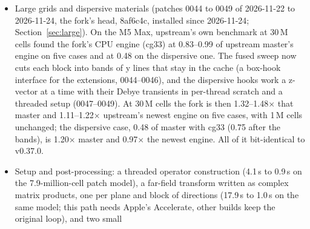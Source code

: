 \begin{itemize}
  stock in the same rounds (cg29 at 8 threads, its best setting; stock at its best of 2, 4 and 8 threads), it runs
  the four models 4.73--6.89$\times$ and the two large ones 1.95$\times$ and 2.72$\times$ as fast as stock
  (Table~\ref{tab:current}); paired with cg18 in rounds of its own (5 rounds, other processes on 0.3--0.6 cores; the
  SMA launch on its 0.871\,M-cell mesh), 1.03--1.23$\times$ as fast at 4 threads and 1.13--1.44$\times$ at 8 over the
  six models. An opt-in tiled sweep (patch 0040 of 2026-11-11, part of the build installed on 2026-11-14) runs
  several time steps on one cache-sized tile that all threads share; at 4 threads it is ahead of the fused sweep at
  its best on two large grids (1.08 and 1.23$\times$) and behind on four other models (0.71--0.92$\times$;
  Section~\ref{sec:tiled}). Three further patches (0041 to 0043, written on 2026-11-12 and 2026-11-13, then the fork's head, 13350ca,
  installed on 2026-11-14) start the automatic thread search at every core outside the efficiency class and pack the state of Debye,
  Lorentz and Drude cells for the line hooks: on the M5 Pro the search then runs at 0.97--1.00 of a fixed 15 threads where cg31's
  ran at 0.81--0.96, and upstream's dispersive case ran 1.9$\times$ as fast at 1\,M cells (Section~\ref{sec:cg33}).
\item Large grids and dispersive materials (patches 0044 to 0049 of 2026-11-22 to 2026-11-24, the fork's head, 8af6c4c, installed since 2026-11-24; Section~\ref{sec:large}). On the M5 Max, upstream's own benchmark at 30\,M cells found the fork's CPU engine (cg33) at 0.83--0.99 of upstream master's  engine on five cases and at 0.48 on the dispersive one. The fused sweep now cuts each block into bands of y lines that stay in the cache (a box-hook interface for the extensions, 0044--0046), and the dispersive hooks work a z-vector at a time with their Debye transients in per-thread scratch and a threaded setup (0047--0049). At 30\,M cells the fork is then 1.32--1.48$\times$ that master and 1.11--1.22$\times$ upstream's newest engine on five cases, with 1\,M cells unchanged; the dispersive case, 0.48 of master with cg33 (0.75 after the bands), is 1.20$\times$ master and 0.97$\times$ the newest engine. All of it bit-identical to v0.37.0.
\item Setup and post-processing: a threaded operator construction (4.1\,s to 0.9\,s on the 7.9-million-cell patch
  model), a far-field transform written as complex matrix products, one per plane and block of directions (17.9\,s to
  1.0\,s on the same model; this path needs Apple's Accelerate, other builds keep the original loop), and two small

\end{itemize}
